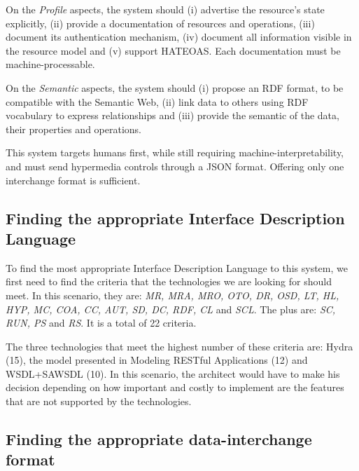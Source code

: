 On the \textit{Profile} aspects, the system should (i) advertise the resource's state explicitly, (ii) provide a documentation of resources and operations, (iii) document its authentication mechanism, (iv) document all information visible in the resource model and (v) support HATEOAS. Each documentation must be machine-processable.

On the \textit{Semantic} aspects, the system should (i) propose an RDF format, to be compatible with the Semantic Web, (ii) link data to others using RDF vocabulary to express relationships and (iii) provide the semantic of the data, their properties and operations.

This system targets humans first, while still requiring machine-interpretability, and must send hypermedia controls through a JSON format. Offering only one interchange format is sufficient.

\subsection{Finding the appropriate Interface Description Language}

To find the most appropriate Interface Description Language to this system, we first need to find the criteria that the technologies we are looking for should meet. In this scenario, they are: \textit{MR, MRA, MRO, OTO, DR, OSD, LT, HL, HYP, MC, COA, CC, AUT, SD, DC, RDF, CL} and \textit{SCL}. The plus are: \textit{SC, RUN, PS} and \textit{RS}. It is a total of 22 criteria.


The three technologies that meet the highest number of these criteria are: Hydra (15), the model presented in Modeling RESTful Applications \cite{Schreier:2011:MRA:1967428.1967434} (12) and WSDL+SAWSDL (10). In this scenario, the architect would have to make his decision depending on how important and costly to implement are the features that are not supported by the technologies.


\subsection{Finding the appropriate data-interchange format}

